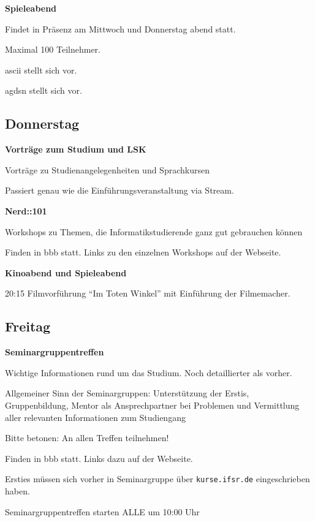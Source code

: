 \documentclass[a4paper,12pt]{scrreprt}
\begin{document}
\textbf{Spieleabend}
\begin{itemize*}
    \item Findet in Präsenz am Mittwoch und Donnerstag abend statt.
    \item Maximal 100 Teilnehmer.
    \item ascii stellt sich vor.
    \item agdsn stellt sich vor.
\end{itemize*}


\subsection{Donnerstag}
\textbf{Vorträge zum Studium und LSK}
\begin{itemize*}
    \item Vorträge zu Studienangelegenheiten und Sprachkursen
    \item Passiert genau wie die Einführungsveranstaltung via Stream.
\end{itemize*}

\textbf{Nerd::101}
\begin{itemize*}
    \item Workshops zu Themen, die Informatikstudierende ganz gut gebrauchen können
    \item Finden in bbb statt. Links zu den einzelnen Workshops auf der Webseite.
\end{itemize*}

\textbf{Kinoabend und Spieleabend}
\begin{itemize*}
     \item 20:15 Filmvorführung \enquote{Im Toten Winkel} mit Einführung der Filmemacher.
\end{itemize*}

\pagebreak

\subsection{Freitag}
\textbf{Seminargruppentreffen}
\begin{itemize*}
    \item Wichtige Informationen rund um das Studium. Noch detaillierter als vorher.
    \item Allgemeiner Sinn der Seminargruppen: Unterstützung der Erstis, Gruppenbildung, Mentor als Ansprechpartner bei Problemen und Vermittlung aller relevanten Informationen zum Studiengang
    \item Bitte betonen: An allen Treffen teilnehmen!
    \item Finden in bbb statt. Links dazu auf der Webseite.
    \item Ersties müssen sich vorher in Seminargruppe über \texttt{kurse.ifsr.de} eingeschrieben haben.
    \item Seminargruppentreffen starten ALLE um 10:00 Uhr
\end{itemize*}
\end{document}
